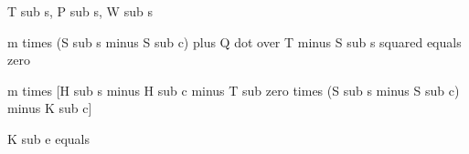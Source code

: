 T sub s, P sub s, W sub s

m times (S sub s minus S sub c) plus Q dot over T minus S sub s squared equals zero

m times [H sub s minus H sub c minus T sub zero times (S sub s minus S sub c) minus K sub c]

K sub e equals